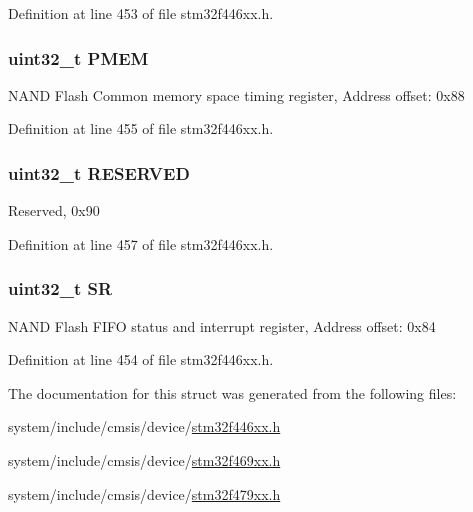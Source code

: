 Definition at line 453 of file stm32f446xx.\+h.

\subsubsection[{\texorpdfstring{P\+M\+EM}{PMEM}}]{ uint32\+\_\+t P\+M\+EM}\hypertarget{struct_f_m_c___bank3___type_def_a64620060ab9533cea56d1c6049fbd612}{}\label{struct_f_m_c___bank3___type_def_a64620060ab9533cea56d1c6049fbd612}
N\+A\+ND Flash Common memory space timing register, Address offset\+: 0x88 

Definition at line 455 of file stm32f446xx.\+h.

\subsubsection[{\texorpdfstring{R\+E\+S\+E\+R\+V\+ED}{RESERVED}}]{\setlength{\rightskip}{0pt plus 5cm}uint32\+\_\+t R\+E\+S\+E\+R\+V\+ED}\hypertarget{struct_f_m_c___bank3___type_def_a0e5030971ec1bfd3101f83f546493c83}{}\label{struct_f_m_c___bank3___type_def_a0e5030971ec1bfd3101f83f546493c83}
Reserved, 0x90 

Definition at line 457 of file stm32f446xx.\+h.

\subsubsection[{\texorpdfstring{SR}{SR}}]{ uint32\+\_\+t SR}\hypertarget{struct_f_m_c___bank3___type_def_af6aca2bbd40c0fb6df7c3aebe224a360}{}\label{struct_f_m_c___bank3___type_def_af6aca2bbd40c0fb6df7c3aebe224a360}
N\+A\+ND Flash F\+I\+FO status and interrupt register, Address offset\+: 0x84 

Definition at line 454 of file stm32f446xx.\+h.



The documentation for this struct was generated from the following files\+:\begin{DoxyCompactItemize}
\item 
system/include/cmsis/device/\hyperlink{stm32f446xx_8h}{stm32f446xx.\+h}\item 
system/include/cmsis/device/\hyperlink{stm32f469xx_8h}{stm32f469xx.\+h}\item 
system/include/cmsis/device/\hyperlink{stm32f479xx_8h}{stm32f479xx.\+h}\end{DoxyCompactItemize}
